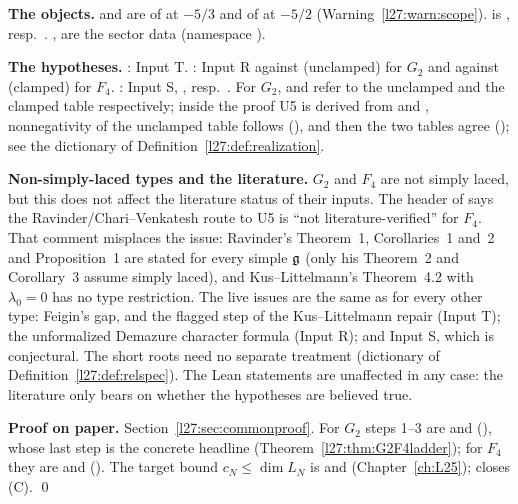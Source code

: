 \begin{dictionary}
\textbf{The objects.}  and  are  of  at $-5/3$ and of 
at $-5/2$ (Warning~\ref{l27:warn:scope}).  is , resp.\ . ,
 are the sector data (namespace ).

\textbf{The hypotheses.} : Input T. : Input R against  (unclamped) for $G_2$ and against
 (clamped) for $F_4$. : Input S, , resp.\ . For $G_2$,
 and  refer to the unclamped and the clamped table respectively; inside the proof U5 is derived from  and
, nonnegativity of the unclamped table follows (), and then the two tables agree
(); see the dictionary of Definition~\ref{l27:def:realization}.

\textbf{Non-simply-laced types and the literature.} $G_2$ and $F_4$ are not simply laced, but this does not affect the literature
status of their inputs. The header of  says the Ravinder/Chari--Venkatesh route to U5 is
``not literature-verified'' for $F_4$. That comment misplaces the issue: Ravinder's Theorem~1, Corollaries~1 and~2 and
Proposition~1 are stated for every simple $\mathfrak g$ (only his Theorem~2 and Corollary~3 assume simply laced), and
Kus--Littelmann's Theorem~4.2 with $\lambda_0=0$ has no type restriction. The live issues are the same as for every other type:
Feigin's gap, and the flagged step of the Kus--Littelmann repair (Input T); the unformalized Demazure character formula
(Input R); and Input S, which is conjectural. The short roots need no separate treatment (dictionary of
Definition~\ref{l27:def:relspec}). The Lean statements are unaffected in any case: the literature only bears on whether the
hypotheses are believed true.
\end{dictionary}

\textbf{Proof on paper.} Section~\ref{l27:sec:commonproof}. For $G_2$ steps 1--3 are  and
 (), whose last step is the concrete
headline  (Theorem~\ref{l27:thm:G2F4ladder}); for $F_4$ they are 
and  (). The target bound
$c_N\le\dim L_N$ is  and  (Chapter~\ref{ch:L25});  closes (C). \qed

